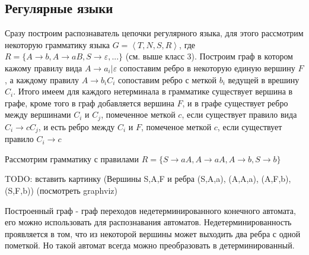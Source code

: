 \subsection{Регулярные языки}

Сразу построим распознаватель цепочки регулярного языка, для этого рассмотрим некоторую грамматику языка $G = \left<T,N,S,R\right>$, где $R = \{A\rightarrow b, A \rightarrow aB, S \rightarrow \varepsilon, ...\}$
(см. выше класс 3). Построим граф в котором кажому правилу вида $A \rightarrow a_i | \varepsilon$ сопоставим ребро в некоторую единую вершину $F$, а каждому правилу $A \rightarrow b_iC_i$
сопоставим ребро с меткой $b_i$ ведущей в врешину $C_i$. Итого имеем для каждого нетерминала в грамматике существует вершина в графе, кроме того в граф добавляется вершина $F$, и в
графе существует ребро между вершинами $C_i$ и $C_j$, помеченное меткой $c$, если существует правило вида $C_i \rightarrow cC_j$, и есть ребро между $C_i$ и $F$, помеченое
меткой $c$, если существует правило $C_i \rightarrow c$

Рассмотрим грамматику с правилами $R = \{S \rightarrow aA, A \rightarrow aA, A \rightarrow b, S \rightarrow b\}$

TODO: вставить картинку (Вершины S,A,F и ребра (S,A,a), (A,A,a), (A,F,b), (S,F,b)) (посмотреть graphviz)

Построенный граф - граф переходов недетерминированного конечного автомата, его можно использовать для распознавания автоматов. Недетерминированность проявляется
в том, что из некоторой вершины может выходить два ребра с одной пометкой. Но такой автомат всегда можно преобразовать в детерминированный.